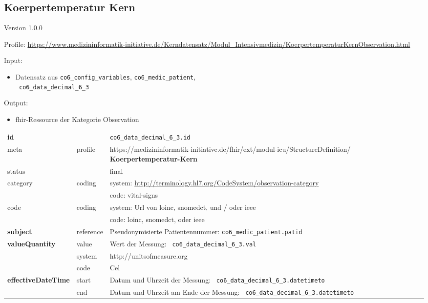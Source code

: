 \subsection{Koerpertemperatur Kern} 
\noindent Version 1.0.0

\noindent Profile: \url{https://www.medizininformatik-initiative.de/Kerndatensatz/Modul_Intensivmedizin/KoerpertemperaturKernObservation.html}

\noindent Input:
\begin{itemize}
	\item Datensatz aus \texttt{co6\_config\_variables}, \texttt{co6\_medic\_patient}, \\ \texttt{
co6\_data\_decimal\_6\_3}
\end{itemize}
Output:
\begin{itemize}
        \item \ac{fhir}-Ressource der Kategorie \glqq Observation\grqq{}
\end{itemize}
\begin{longtable}{|l|l|p{7.5cm}|}
        \hline
        \rowcolor{lightgray} \multicolumn{3}{|l|}{Data Mapping (inhaltlich)} \\ \hline
        \textbf{id} &  & \texttt{co6\_data\_decimal\_6\_3.id} \\ \hline
	meta & profile & https://medizininformatik-initiative.de/fhir/ext/modul-icu/StructureDefinition/\textbf{
Koerpertemperatur-Kern} \\ \hline 
	status &  & final   \\ \hline 
	category & coding & system: \url{http://terminology.hl7.org/CodeSystem/observation-category} \\
\cline{3-3}
	& & code: vital-signs \\ \hline
	code & coding & system: Url von \ac{loinc}, \ac{snomedct}, und / oder \ac{ieee} \\ 
	\cline{3-3} 
	 &  & code: \ac{loinc}, \ac{snomedct}, oder \ac{ieee} \\ \hline
	 \textbf{subject}  & reference & Pseudonymisierte Patientennummer: \texttt{co6\_medic\_patient.patid} \\ \hline
	 \textbf{valueQuantity}  & value & Wert der Messung: \texttt{
co6\_data\_decimal\_6\_3.val} \\
        \cline{2-3}
         & system & http://unitsofmeasure.org \\
         \cline{2-3}
         & code & Cel \\ \hline
     \textbf{effectiveDateTime}  & start & Datum und Uhrzeit der Messung: \texttt{
co6\_data\_decimal\_6\_3.datetimeto} \\
    \cline{2-3}
     & end & Datum und Uhrzeit am Ende der Messung: \texttt{
co6\_data\_decimal\_6\_3.datetimeto} \\ \hline
\end{longtable}


